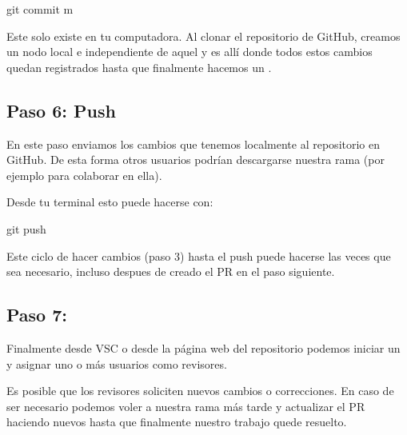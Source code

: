\documentclass[a4paper,12pt,spanish]{sphinxmanual}
\begin{document}
\begin{sphinxVerbatim}[commandchars=\\\{\}]
git commit \PYGZhy{}m 
\end{sphinxVerbatim}

\sphinxAtStartPar
{} Este  solo existe en tu computadora. Al clonar el
repositorio de GitHub, creamos un nodo local e independiente de aquel y es
allí donde todos estos cambios quedan registrados hasta que finalmente hacemos
un .


\subsection{Paso 6: Push}
\label{\detokenize{mi-primer-pr:paso-6-push}}
\sphinxAtStartPar
En este paso enviamos los cambios que tenemos localmente al repositorio en GitHub.
De esta forma otros usuarios podrían descargarse nuestra rama (por ejemplo para
colaborar en ella).

\noindent{}

\sphinxAtStartPar
Desde tu terminal esto puede hacerse con:

\begin{sphinxVerbatim}[commandchars=\\\{\}]
git push
\end{sphinxVerbatim}

\sphinxAtStartPar
Este ciclo de hacer cambios (paso 3) hasta el push puede hacerse las veces que
sea necesario, incluso despues de creado el PR en el paso siguiente.


\subsection{Paso 7: }
\label{\detokenize{mi-primer-pr:paso-7-pull-requets}}
\sphinxAtStartPar
Finalmente desde VSC o desde la página web del repositorio podemos
iniciar un  y asignar uno o más usuarios como revisores.

\noindent{}

\sphinxAtStartPar
Es posible que los revisores soliciten nuevos cambios o correcciones.
En caso de ser necesario podemos voler a nuestra rama más tarde y
actualizar el PR haciendo nuevos  hasta que finalmente nuestro
trabajo quede resuelto.
\end{document}
